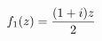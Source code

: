 \documentclass[preview]{standalone}
\begin{document}
\begin{align*}
\special{dvisvgm:raw <g id='unique000'>}f_1(z) = \frac{(1+i)z}{2}\special{dvisvgm:raw </g>}
\end{align*}
\end{document}
